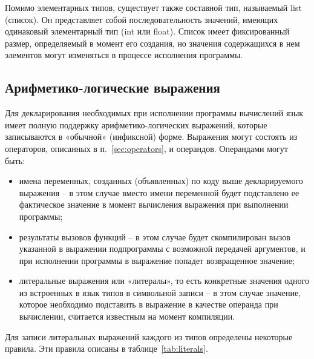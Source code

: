 Помимо элементарных типов, существует также составной тип, называемый list (список).
Он представляет собой последовательность значений, имеющих одинаковый элементарный тип (int или float).
Список имеет фиксированный размер, определяемый в момент его создания, но значения содержащихся в нем элементов могут изменяться в процессе исполнения программы.

\subsection{Арифметико-логические выражения}

Для декларирования необходимых при исполнении программы вычислений язык имеет полную поддержку арифметико-логических выражений, которые записываются в «обычной» (инфиксной) форме.
Выражения могут состоять из операторов, описанных в п.~\ref{sec:operators}, и операндов.
Операндами могут быть:

\begin{itemize}
    \item имена переменных, созданных (объявленных) по коду выше декларируемого выражения -- в этом случае вместо имени переменной будет подставлено ее фактическое значение в момент вычисления выражения при выполнении программы;
    \item результаты вызовов функций -- в этом случае будет скомпилирован вызов указанной в выражении подпрограммы с возможной передачей аргументов, и при исполнении программы в выражение попадет возвращенное значение;
    \item литеральные выражения или «литералы», то есть конкретные значения одного из встроенных в язык типов в символьной записи -- в этом случае значение, которое необходимо подставить в выражение в качестве операнда при вычислении, считается известным на момент компиляции.
\end{itemize}

Для записи литеральных выражений каждого из типов определены некоторые правила.
Эти правила описаны в таблице~\ref{tab:literals}.

